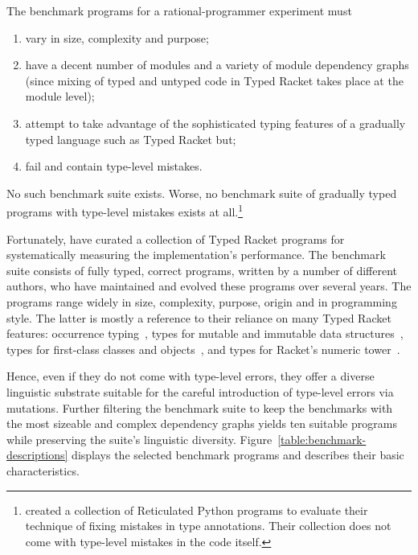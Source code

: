 
The benchmark programs for a rational-programmer experiment must 
\begin{enumerate}
   
\item vary in size, complexity and purpose; 
    
\item have a decent number of modules and a variety of module dependency graphs
 (since mixing of typed and untyped code in Typed Racket takes place at the
 module level);

\item attempt to take  advantage of the sophisticated typing features of
 a gradually typed language such as Typed Racket but;

\item  fail and contain type-level mistakes. 
\end{enumerate}
\noindent
No such benchmark suite exists.  Worse, no benchmark suite of
gradually typed programs with type-level mistakes exists at
all.\footnote{\citet{cc-oopsla-20} created a collection of Reticulated
Python programs to evaluate their technique of fixing mistakes in type
annotations. Their collection does not come with type-level mistakes
in the code itself.} 

Fortunately, \citet{gtnffvf-jfp-2019} have curated a collection of Typed Racket
programs for systematically measuring the implementation's performance. The
benchmark suite consists of fully typed, correct programs, written by a number
of different authors, who have maintained and evolved these programs over
several years. The programs range widely in size, complexity, purpose, origin
and in programming style. The latter is mostly a reference to their reliance on
many Typed Racket features: occurrence typing~\cite{tf-icfp-2010}, types for
mutable and immutable data structures~\cite{hpst-sfp-2010}, types for
first-class classes and objects~\cite{tsdtf-oopsla-2012}, and types for Racket's
numeric tower~\cite{stathff-padl-12}.

Hence, even if they do not come with type-level errors, they offer a
diverse linguistic substrate suitable for the careful introduction of
type-level errors via mutations. Further filtering the benchmark suite to
keep the benchmarks with the most sizeable and complex dependency graphs
yields ten suitable programs while preserving the suite's linguistic
diversity. Figure~\ref{table:benchmark-descriptions} displays the selected
benchmark programs and describes their basic characteristics.
